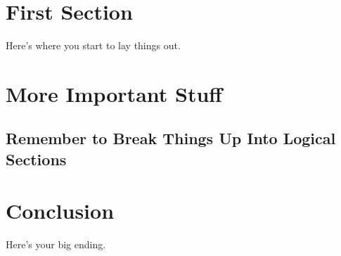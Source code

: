 \documentclass{icmmcm}
\begin{document}
\section{First Section}

Here's where you start to lay things out.


\section{More Important Stuff}

\subsection{Remember to Break Things Up Into Logical Sections}


\section{Conclusion}

Here's your big ending.






\end{document}
